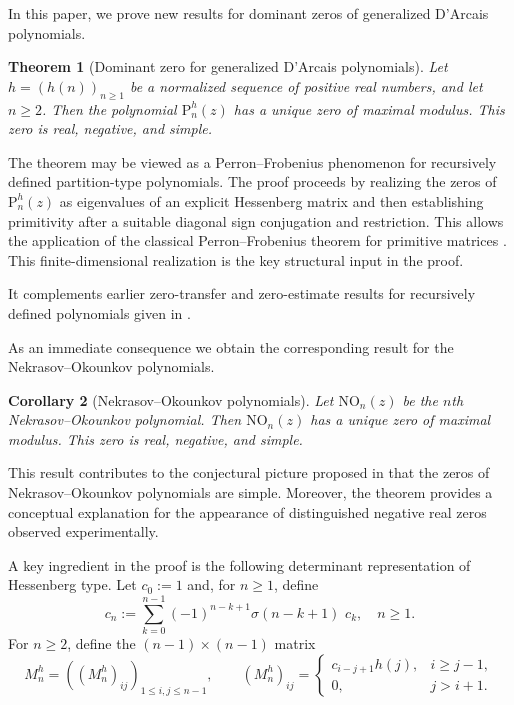 \documentclass[11pt,reqno]{amsart}
\theoremstyle{plain}
\newtheorem{theorem}{Theorem}[section]
\newtheorem{corollary}[theorem]{Corollary}
\theoremstyle{remark}
\theoremstyle{definition}
\numberwithin{equation}{section}
\newcommand{\Mnhkoeff}{\left( M_{n}^{h}\right) }
\newcommand{\nop}{\mathrm{NO}}
\newcommand{\pol}{\mathrm{P}}
\begin{document}
In this paper, we prove new results for dominant zeros of %
generalized D'Arcais polynomials. 


\begin{theorem}[Dominant zero for generalized D'Arcais polynomials]
\label{th:Darcais}
Let $h=(h(n))_{n\ge1}$ be a normalized sequence of positive real numbers, and let
$n\ge2$. Then the polynomial $\pol _n^h(z)$ has a unique zero of maximal modulus. This
zero is real, negative, and simple.
\end{theorem}

The theorem may be viewed as a Perron--Frobenius phenomenon for recursively defined
partition-type polynomials. The proof proceeds by realizing the zeros of $\pol _n^h(z)$ as
eigenvalues of an explicit Hessenberg matrix and then establishing primitivity after a suitable
diagonal sign conjugation and restriction. This allows the application of the classical Perron--Frobenius
theorem for primitive matrices \cite{BP94,HJ12,Se06}. 
This finite-dimensional realization is the key structural input in the proof.

It complements earlier zero-transfer and zero-estimate results for recursively defined polynomials given in \cite{HNT23,HN24B}.

As an immediate consequence we obtain the corresponding result for the Nekrasov--Okounkov
polynomials.

\begin{corollary}[Nekrasov--Okounkov polynomials]\label{NO}
Let $\nop _n(z)$ be the $n$th Nekrasov--Okounkov polynomial. Then $\nop _n(z)$ has a unique
zero of maximal modulus. This zero is real, negative, and simple.
\end{corollary}

This result contributes to the conjectural picture proposed in \cite{HN19} that the zeros of
Nekrasov--Okounkov polynomials are simple. Moreover, the theorem provides a conceptual
explanation for the appearance of distinguished negative real zeros observed experimentally.

A key ingredient in the proof is the following determinant representation of Hessenberg type. 
Let $c_0:=1$ and, for $n \geq 1$, define
 \begin{equation}\label{cm}
c_n := \sum_{k=0}^{n-1} (-1)^{n-k+1} \sigma(n-k+1) \,\, c_k, \quad  n \geq 1.
\end{equation}
For $n\ge2$, define the $(n-1)\times(n-1)$ matrix
\[
M_n^h=\left(\Mnhkoeff _{ij}\right)_{1\le i,j\le n-1},
\qquad
\Mnhkoeff _{ij}=
\begin{cases}
c_{i-j+1}h(j), & i\ge j-1,\\
0, & j>i+1.
\end{cases}
\]
\end{document}
